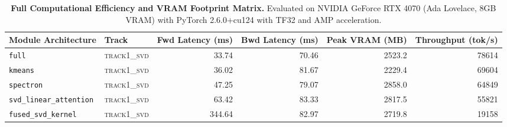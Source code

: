 \begin{table}[t]
\centering
\small
\caption{\textbf{Full Computational Efficiency and VRAM Footprint Matrix.} Evaluated on NVIDIA GeForce RTX 4070 (Ada Lovelace, 8GB VRAM) with PyTorch 2.6.0+cu124 with TF32 and AMP acceleration.}
\label{tab:efficiency_benchmark_results}
\begin{tabular}{l l r r r r}
\toprule
\textbf{Module Architecture} & \textbf{Track} & \textbf{Fwd Latency (ms)} & \textbf{Bwd Latency (ms)} & \textbf{Peak VRAM (MB)} & \textbf{Throughput (tok/s)} \\
\midrule
\texttt{full} & \textsc{track1\_svd} & 33.74 & 70.46 & 2523.2 & 78614 \\
\texttt{kmeans} & \textsc{track1\_svd} & 36.02 & 81.67 & 2229.4 & 69604 \\
\texttt{spectron} & \textsc{track1\_svd} & 47.25 & 79.07 & 2858.0 & 64849 \\
\texttt{svd\_linear\_attention} & \textsc{track1\_svd} & 63.42 & 83.33 & 2817.5 & 55821 \\
\texttt{fused\_svd\_kernel} & \textsc{track1\_svd} & 344.64 & 82.97 & 2719.8 & 19158 \\
\bottomrule
\end{tabular}
\end{table}
